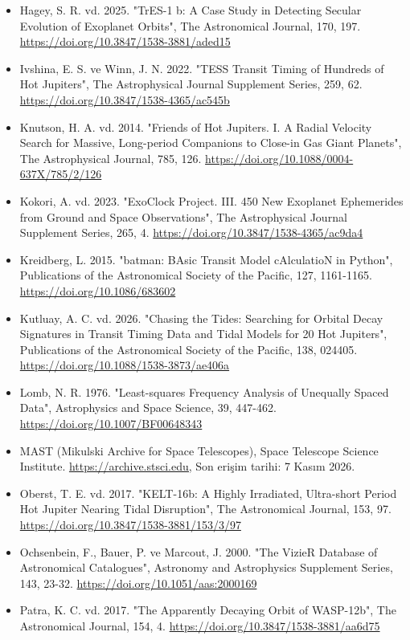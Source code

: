 \begin{itemize}[leftmargin=1em,itemsep=1pt]
\item Hagey, S. R. vd. 2025. "TrES-1 b: A Case Study in Detecting Secular Evolution of Exoplanet Orbits", The Astronomical Journal, 170, 197. \url{https://doi.org/10.3847/1538-3881/aded15}
\item Ivshina, E. S. ve Winn, J. N. 2022. "TESS Transit Timing of Hundreds of Hot Jupiters", The Astrophysical Journal Supplement Series, 259, 62. \url{https://doi.org/10.3847/1538-4365/ac545b}
\item Knutson, H. A. vd. 2014. "Friends of Hot Jupiters. I. A Radial Velocity Search for Massive, Long-period Companions to Close-in Gas Giant Planets", The Astrophysical Journal, 785, 126. \url{https://doi.org/10.1088/0004-637X/785/2/126}
\item Kokori, A. vd. 2023. "ExoClock Project. III. 450 New Exoplanet Ephemerides from Ground and Space Observations", The Astrophysical Journal Supplement Series, 265, 4. \url{https://doi.org/10.3847/1538-4365/ac9da4}
\item Kreidberg, L. 2015. "batman: BAsic Transit Model cAlculatioN in Python", Publications of the Astronomical Society of the Pacific, 127, 1161-1165. \url{https://doi.org/10.1086/683602}
\item Kutluay, A. C. vd. 2026. "Chasing the Tides: Searching for Orbital Decay Signatures in Transit Timing Data and Tidal Models for 20 Hot Jupiters", Publications of the Astronomical Society of the Pacific, 138, 024405. \url{https://doi.org/10.1088/1538-3873/ae406a}
\item Lomb, N. R. 1976. "Least-squares Frequency Analysis of Unequally Spaced Data", Astrophysics and Space Science, 39, 447-462. \url{https://doi.org/10.1007/BF00648343}
\item MAST (Mikulski Archive for Space Telescopes), Space Telescope Science Institute. \url{https://archive.stsci.edu,} Son erişim tarihi: 7 Kasım 2026.
\item Oberst, T. E. vd. 2017. "KELT-16b: A Highly Irradiated, Ultra-short Period Hot Jupiter Nearing Tidal Disruption", The Astronomical Journal, 153, 97. \url{https://doi.org/10.3847/1538-3881/153/3/97}
\item Ochsenbein, F., Bauer, P. ve Marcout, J. 2000. "The VizieR Database of Astronomical Catalogues", Astronomy and Astrophysics Supplement Series, 143, 23-32. \url{https://doi.org/10.1051/aas:2000169}
\item Patra, K. C. vd. 2017. "The Apparently Decaying Orbit of WASP-12b", The Astronomical Journal, 154, 4. \url{https://doi.org/10.3847/1538-3881/aa6d75}

\end{itemize}
